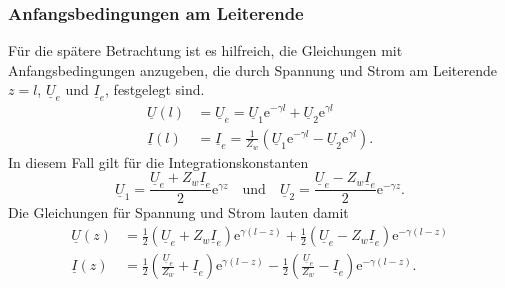\documentclass[paper=a4, parskip=half-, ngerman, fontsize=11pt]{scrreprt}
\begin{document}
\subsubsection{Anfangsbedingungen am Leiterende}

Für die spätere Betrachtung ist es hilfreich, die Gleichungen mit Anfangsbedingungen anzugeben, die durch Spannung und
Strom am Leiterende $z=l$, $\underline{U}_{e}$ und $\underline{I}_{e}$, festgelegt sind.
\begin{align*}
    \underline{U}(l) &= \underline{U}_{e} = \underline{U}_{1} \mathrm{e}^{- \gamma l}
    +
    \underline{U}_{2} \mathrm{e}^{ \gamma l} \\[1ex]
    \underline{I}(l) &= \underline{I}_{e} = \frac{1}{Z_{w}}
    \left(
    \underline{U}_{1} \mathrm{e}^{- \gamma l}
    -
    \underline{U}_{2} \mathrm{e}^{ \gamma l}
    \right).
\end{align*}
In diesem Fall gilt für die Integrationskonstanten
\[ \underline{U}_{1} = \frac{\underline{U}_{e} + Z_{w} \underline{I}_{e}}{2} \mathrm{e}^{\gamma z} \quad \text{und}
\quad \underline{U}_{2} = \frac{\underline{U}_{e} - Z_{w} \underline{I}_{e}}{2} \mathrm{e}^{- \gamma z}. \]
Die Gleichungen für Spannung und Strom lauten damit
\begin{align}
    \underline{U}(z) &=
    \frac{1}{2} \left( \underline{U}_{e} + Z_{w} \underline{I}_{e} \right) \mathrm{e}^{\gamma (l - z)}
    +
    \frac{1}{2} \left( \underline{U}_{e} - Z_{w} \underline{I}_{e} \right) \mathrm{e}^{- \gamma (l - z)} \label{eq:UxE}
    \\[1ex]
    \underline{I}(z) &=
    \frac{1}{2} \left( \frac{\underline{U}_{e}}{Z_{w}} + \underline{I}_{e} \right) \mathrm{e}^{\gamma (l - z)}
    -
    \frac{1}{2} \left( \frac{\underline{U}_{e}}{Z_{w}} - \underline{I}_{e} \right) \mathrm{e}^{- \gamma (l - z)}
    \label{eq:IxE} .
\end{align}
\end{document}
